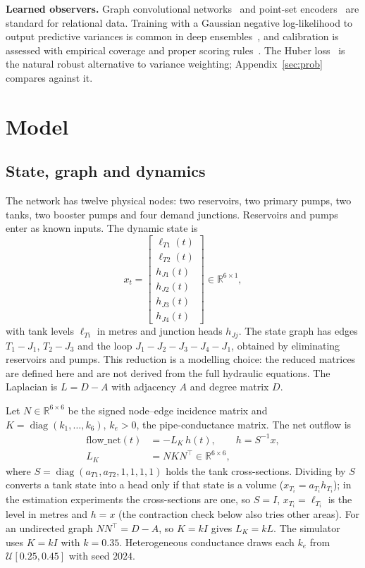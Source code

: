 \documentclass[conference]{IEEEtran}
\begin{document}
\textbf{Learned observers.} Graph convolutional networks~\cite{kipf2017} and point-set encoders~\cite{pointnet,pointnetpp} are standard for relational data. Training with a Gaussian negative log-likelihood to output predictive variances is common in deep ensembles~\cite{lakshminarayanan2017}, and calibration is assessed with empirical coverage and proper scoring rules~\cite{guo2017,gneiting2007}. The Huber loss~\cite{huber1964} is the natural robust alternative to variance weighting; Appendix~\ref{sec:prob} compares against it.

\section{Model}
\label{sec:model}

\subsection{State, graph and dynamics}

The network has twelve physical nodes: two reservoirs, two primary pumps, two tanks, two booster pumps and four demand junctions. Reservoirs and pumps enter as known inputs. The dynamic state is
\begin{equation}
x_t = \begin{bmatrix}\ell_{T1}(t)\\ \ell_{T2}(t)\\ h_{J1}(t)\\ h_{J2}(t)\\ h_{J3}(t)\\ h_{J4}(t)\end{bmatrix}\in\mathbb{R}^{6\times 1},
\label{eq:state}
\end{equation}
with tank levels $\ell_{Ti}$ in metres and junction heads $h_{Jj}$. The state graph has edges $T_1{-}J_1$, $T_2{-}J_3$ and the loop $J_1{-}J_2{-}J_3{-}J_4{-}J_1$, obtained by eliminating reservoirs and pumps. This reduction is a modelling choice: the reduced matrices are defined here and are not derived from the full hydraulic equations. The Laplacian is $L=D-A$ with adjacency $A$ and degree matrix $D$.

Let $N\in\mathbb{R}^{6\times 6}$ be the signed node--edge incidence matrix and $K=\operatorname{diag}(k_1,\dots,k_6)$, $k_e>0$, the pipe-conductance matrix. The net outflow is
\begin{equation}
\begin{aligned}
\text{flow\_net}(t)&=-L_K\,h(t), \qquad h=S^{-1}x,\\
L_K&=NKN^\top\in\mathbb{R}^{6\times 6},
\end{aligned}
\label{eq:flow}
\end{equation}
where $S=\operatorname{diag}(a_{T1},a_{T2},1,1,1,1)$ holds the tank cross-sections. Dividing by $S$ converts a tank state into a head only if that state is a volume ($x_{T_i}=a_{T_i}h_{T_i}$); in the estimation experiments the cross-sections are one, so $S=I$, $x_{T_i}=\ell_{T_i}$ is the level in metres and $h=x$ (the contraction check below also tries other areas). For an undirected graph $NN^\top=D-A$, so $K=kI$ gives $L_K=kL$. The simulator uses $K=kI$ with $k=0.35$. Heterogeneous conductance draws each $k_e$ from $\mathcal U[0.25,0.45]$ with seed $2024$.
\end{document}
